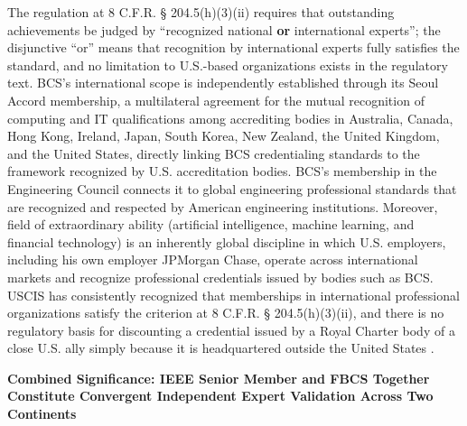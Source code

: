 The regulation at 8 C.F.R. § 204.5(h)(3)(ii) requires that outstanding achievements be judged by ``recognized national \textbf{or} international experts''; the disjunctive ``or'' means that recognition by international experts fully satisfies the standard, and no limitation to U.S.-based organizations exists in the regulatory text. BCS's international scope is independently established through its Seoul Accord membership, a multilateral agreement for the mutual recognition of computing and IT qualifications among accrediting bodies in Australia, Canada, Hong Kong, Ireland, Japan, South Korea, New Zealand, the United Kingdom, and the United States, directly linking BCS credentialing standards to the framework recognized by U.S. accreditation bodies. BCS's membership in the Engineering Council connects it to global engineering professional standards that are recognized and respected by American engineering institutions. Moreover, \drs field of extraordinary ability (artificial intelligence, machine learning, and financial technology) is an inherently global discipline in which U.S. employers, including his own employer JPMorgan Chase, operate across international markets and recognize professional credentials issued by bodies such as BCS. USCIS has consistently recognized that memberships in international professional organizations satisfy the criterion at 8 C.F.R. § 204.5(h)(3)(ii), and there is no regulatory basis for discounting a credential issued by a Royal Charter body of a close U.S. ally simply because it is headquartered outside the United States \cite{bcsfellowguidance, bcsroyalcharter}.

\vspace{1em}

\textbf{Combined Significance: IEEE Senior Member and FBCS Together Constitute Convergent Independent Expert Validation Across Two Continents}

